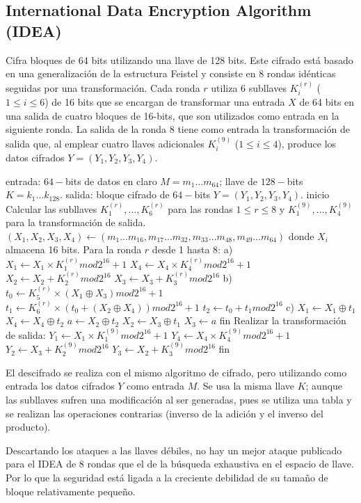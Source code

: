 \subsection{International Data Encryption Algorithm (IDEA)}

Cifra bloques de 64 bits utilizando una llave de 128 bits. Este cifrado
está basado en una generalización de la estructura Feistel y consiste en
8 rondas idénticas seguidas por una transformación. Cada ronda $r$
utiliza 6 subllaves $K^{(r)}_i$ ($1 \leq i \leq 6$) de 16 bits que se
encargan de transformar una entrada $X$ de 64 bits en una salida de
cuatro bloques de 16-bits, que son utilizados como entrada en la
siguiente ronda. La salida de la ronda 8 tiene como entrada la
transformación de salida que, al emplear cuatro llaves adicionales
$K^{(9)}_i$ ($1 \leq i \leq 4$), produce los datos cifrados
$Y = (Y_1, Y_2, Y_3, Y_4)$.


\begin{pseudocodigo}[caption={IDEA, cifrado.}, label={idea:1}]
  entrada:   $64-$bits de datos en claro $M = m_1 \dots m_64$;
             llave de $128-$bits $ K = k_1 \dots k_{128}$.
  salida:    bloque cifrado de $64-$bits $Y = (Y_1, Y_2, Y_3, Y_4)$.
  inicio
    Calcular las subllaves $K^{(r)}_1, \dots, K^{(r)}_{6}$ para las rondas $1 \leq r \leq 8$ y $K^{(9)}_1, \dots, K^{(9)}_{4}$
    para la transformación de salida.
    $(X_1, X_2, X_3, X_4) \leftarrow (m_1 \dots m_{16}, m_{17} \dots m_{32}, m_{33} \dots m_{48}, m_{49} \dots m_{64})$
        donde $X_i$ almacena 16 bits.
    Para la ronda $r$ desde 1 hasta 8:
      a) $X_1 \leftarrow X_1 \times K_1^{(r)} mod 2^{16} + 1$
         $X_4 \leftarrow X_4 \times K_4^{(r)} mod 2^{16} + 1$
         $X_2 \leftarrow X_2 + K_2^{(r)} mod 2^{16}$
         $X_3 \leftarrow X_3 + K_3^{(r)} mod 2^{16}$
      b) $t_0 \leftarrow K_5^{(r)} \times (X_1 \oplus X_3) mod 2^{16} + 1$
         $t_1 \leftarrow K_6^{(r)} \times (t_0 + (X_2 \oplus X_4)) mod 2^{16} + 1$
         $t_2 \leftarrow t_0 + t_1 mod 2^{16}$
      c) $X_1 \leftarrow X_1 \oplus t_1$
         $X_4 \leftarrow X_4 \oplus t_2$
         $a \leftarrow X_2 \oplus t_2$
         $X_2 \leftarrow X_3 \oplus t_1$
         $X_3 \leftarrow a$
    fin
    Realizar la transformación de salida:
      $Y_1 \leftarrow X_1 \times K_1^{(9)} mod 2^{16} + 1$
      $Y_4 \leftarrow X_4 \times K_4^{(9)} mod 2^{16} + 1$
      $Y_2 \leftarrow X_3 + K_2^{(9)} mod 2^{16}$
      $Y_3 \leftarrow X_2 + K_3^{(9)} mod 2^{16}$
  fin
\end{pseudocodigo}

El descifrado se realiza con el mismo algoritmo de cifrado, pero
utilizando como entrada los datos cifrados $Y$ como entrada $M$. Se usa la
misma llave $K$; aunque las subllaves sufren una modificación al ser
generadas, pues se utiliza una tabla y se realizan las operaciones
contrarias (inverso de la adición y el inverso del producto).

Descartando los ataques a las llaves débiles, no hay un mejor ataque
publicado para el IDEA de 8 rondas que el de la búsqueda exhaustiva
en el espacio de llave. Por lo que la seguridad está ligada a la
creciente debilidad de su tamaño de bloque relativamente pequeño.

